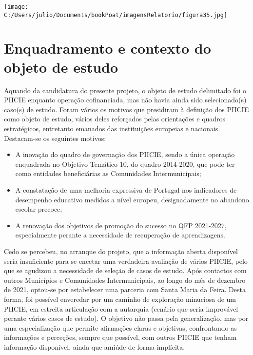 \documentclass[
]{book}
\providecommand{\tightlist}{%
  \setlength{\itemsep}{0pt}\setlength{\parskip}{0pt}}
\begin{document}
\texttt{[image: C:/Users/julio/Documents/bookPoat/imagensRelatorio/figura35.jpg]}

\hypertarget{enquadramento-e-contexto-do-objeto-de-estudo}{%
\chapter{\texorpdfstring{\textbf{Enquadramento e contexto do objeto de estudo}}{Enquadramento e contexto do objeto de estudo}}\label{enquadramento-e-contexto-do-objeto-de-estudo}}

Aquando da candidatura do presente projeto, o objeto de estudo delimitado foi o PIICIE enquanto operação cofinanciada, mas não havia ainda sido selecionado(s) caso(s) de estudo. Foram vários os motivos que presidiram à definição dos PIICIE como objeto de estudo, vários deles reforçados pelas orientações e quadros estratégicos, entretanto emanados das instituições europeias e nacionais. Destacam-se os seguintes motivos:

\begin{itemize}
\tightlist
\item
  A inovação do quadro de governação dos PIICIE, sendo a única operação enquadrada no Objetivo Temático 10, do quadro 2014-2020, que pode ter como entidades beneficiárias as Comunidades Intermunicipais;
\item
  A constatação de uma melhoria expressiva de Portugal nos indicadores de desempenho educativo medidos a nível europeu, designadamente no abandono escolar precoce;
\item
  A renovação dos objetivos de promoção do sucesso no QFP 2021-2027, especialmente perante a necessidade de recuperação de aprendizagens.
\end{itemize}

Cedo se percebeu, no arranque do projeto, que a informação aberta disponível seria insuficiente para se encetar uma verdadeira avaliação de vários PIICIE, pelo que se agudizou a necessidade de seleção de casos de estudo. Após contactos com outros Municípios e Comunidades Intermunicipais, ao longo do mês de dezembro de 2021, optou-se por estabelecer uma parceria com Santa Maria da Feira. Desta forma, foi possível enveredar por um caminho de exploração minuciosa de um PIICIE, em estreita articulação com a autarquia (cenário que seria improvável perante vários casos de estudo). O objetivo não passa pela generalização, mas por uma especialização que permite afirmações claras e objetivas, confrontando as informações e perceções, sempre que possível, com outros PIICIE que tenham informação disponível, ainda que amiúde de forma implícita.
\end{document}

